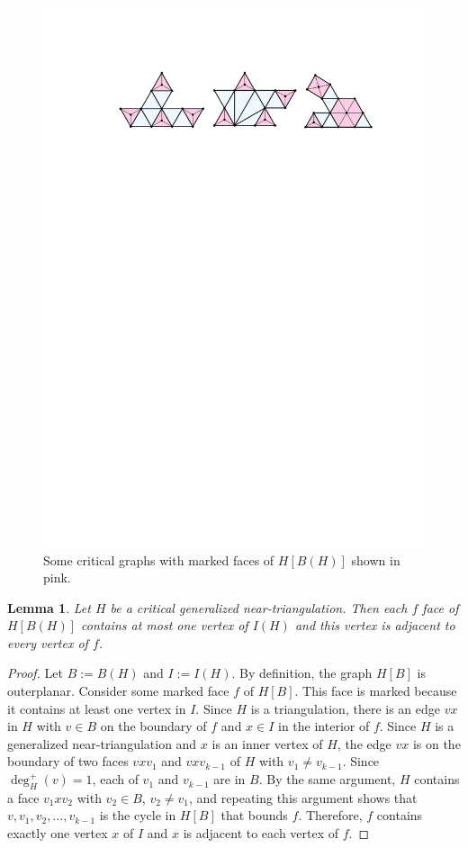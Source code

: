 \documentclass[a4paper,UKenglish,cleveref, autoref, thm-restate]{lipics-v2021}
\newtheorem{lem}{Lemma}
\begin{document}
\begin{figure}[htbp]
    \centering
    \includegraphics[page=1]{figs/critical}
    \caption{Some critical graphs with marked faces of $H[B(H)]$ shown in pink.}
    \label{critical_fig}
\end{figure}


\begin{lem}\label{critical_structure}
    Let $H$ be a critical generalized near-triangulation. Then each $f$ face of $H[B(H)]$ contains at most one vertex of $I(H)$ and this vertex is adjacent to every vertex of $f$.
\end{lem}

\begin{proof}
  Let $B:=B(H)$ and $I:=I(H)$.
  By definition, the graph $H[B]$ is outerplanar.  Consider some marked face $f$ of $H[B]$.  This face is marked because it contains at least one vertex in $I$.  Since $H$ is a triangulation, there is an edge $vx$ in $H$ with $v\in B$ on the boundary of $f$ and $x\in I$ in the interior of $f$. Since $H$ is a generalized near-triangulation and $x$ is an inner vertex of $H$, the edge $vx$ is on the boundary of two faces $vxv_1$ and $vxv_{k-1}$ of $H$ with $v_1\neq v_{k-1}$.  Since $\deg^+_H(v)=1$, each of $v_1$ and $v_{k-1}$ are in $B$.  By the same argument, $H$ contains a face $v_1xv_2$ with $v_2\in B$, $v_2\neq v_1$, and repeating this argument shows that $v,v_1,v_2,\ldots,v_{k-1}$ is the cycle in $H[B]$ that bounds $f$.  Therefore, $f$ contains exactly one vertex $x$ of $I$ and $x$ is adjacent to each vertex of $f$.
\end{proof}
\end{document}
